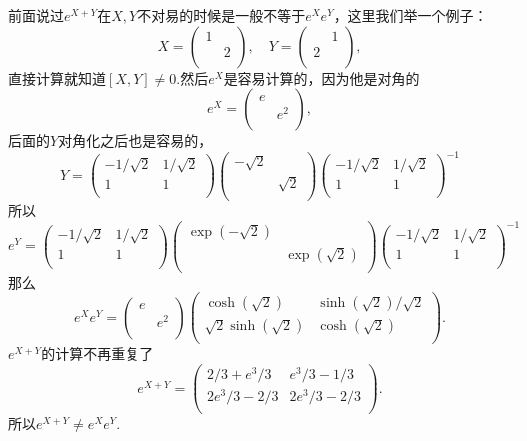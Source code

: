 前面说过$e^{X+Y}$在$X,Y$不对易的时候是一般不等于$e^Xe^Y$，这里我们举一个例子：
\[
X=\begin{pmatrix}
1&\\
&2\\
\end{pmatrix},
\quad
Y=\begin{pmatrix}
&1\\
2&\\
\end{pmatrix},
\]
直接计算就知道$[X,Y]\neq 0$.然后$e^X$是容易计算的，因为他是对角的
\[
e^X=\begin{pmatrix}
e&\\
&e^2\\
\end{pmatrix},
\]
后面的$Y$对角化之后也是容易的，
\[
Y=
\begin{pmatrix}
 -1/\sqrt{2} & 1/\sqrt{2} \\
 1 & 1 \\
\end{pmatrix}
\begin{pmatrix}
 -\sqrt{2} &  \\
  & \sqrt{2} \\
\end{pmatrix}
\begin{pmatrix}
 -1/\sqrt{2} & 1/\sqrt{2} \\
 1 & 1 \\
\end{pmatrix}^{-1}
\]
所以
\[
e^Y=
\begin{pmatrix}
 -1/\sqrt{2} & 1/\sqrt{2} \\
 1 & 1 \\
\end{pmatrix}
\begin{pmatrix}
 \exp(-\sqrt{2}) &  \\
  & \exp(\sqrt{2}) \\
\end{pmatrix}
\begin{pmatrix}
 -1/\sqrt{2} & 1/\sqrt{2} \\
 1 & 1 \\
\end{pmatrix}^{-1}
\]
那么
\[
e^Xe^Y=
\begin{pmatrix}
e&\\
&e^2\\
\end{pmatrix}
\begin{pmatrix}
\cosh \left(\sqrt{2}\right)&\sinh \left(\sqrt{2}\right)/\sqrt{2}\\
\sqrt{2} \sinh \left(\sqrt{2}\right)&\cosh \left(\sqrt{2}\right)\\
\end{pmatrix}.
\]
$e^{X+Y}$的计算不再重复了
\[
e^{X+Y}=\begin{pmatrix}
 2/3+e^3/3 & e^3/3-1/3 \\
 2 e^3/3-2/3 & 2 e^3/3-2/3 \\
\end{pmatrix}.
\]
所以$e^{X+Y}\neq e^Xe^Y$.

